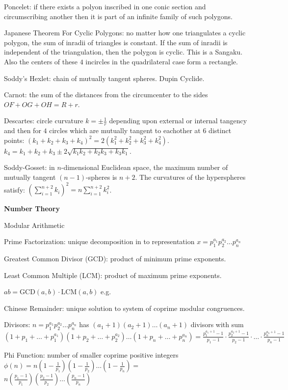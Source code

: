 Poncelet: if there exists a polyon inscribed in one conic section and circumscribing another then it is part of an infinite family of such polygons.

Japanese Theorem For Cyclic Polygons: no matter how one triangulates a cyclic polygon, the sum of inradii of triangles is constant. If the sum of inradii is independent of the triangulation, then the polygon is cyclic. This is a Sangaku. Also the centers of these $4$ incircles in the quadrilateral case form a rectangle.

Soddy's Hexlet: chain of mutually tangent spheres. Dupin Cyclide.

Carnot: the sum of the distances from the circumcenter to the sides $OF + OG + OH = R + r$.

Descartes: circle curvature $k = \pm \frac{1}{r}$ depending upon external or internal tangency and then for $4$ circles which are mutually tangent to eachother at $6$ distinct points: $\left( k_1 + k_2 + k_3 + k_4 \right)^2 = 2 \left( k_1^2 + k_2^2 + k_3^2 + k_4^2 \right)$. $k_4 = k_1 + k_2 + k_3 \pm 2 \sqrt{k_1 k_2 + k_2 k_3 + k_3 k_1}$.

Soddy-Gosset: in $n$-dimensional Euclidean space, the maximum number of mutually tangent $(n-1)$-spheres is $n+2$. The curvatures of the hyperspheres satisfy: $\left( \sum_{i=1}^{n+2} k_i \right)^2 = n \sum_{i=1}^{n+2} k_i^2$.

\newpage

\textbf{Number Theory}

Modular Arithmetic

Prime Factorization: unique decomposition in to representation $x=p_1^{a_1} p_2^{a_2}\dots p_n^{a_n}$

Greatest Common Divisor (GCD): product of minimum prime exponents.

Least Common Multiple (LCM): product of maximum prime exponents.

$ab=\text{GCD}(a,b) \cdot \text{LCM}(a,b)$ e.g.

Chinese Remainder: unique solution to system of coprime modular congruences.

Divisors: $n=p_1^{a_1} p_2^{a_2} \dots p_n^{a_n}$ has $(a_1 + 1)(a_2 + 1) \dots (a_n + 1)$ divisors with sum $(1+p_1+ \dots + p_1^{a_1})(1+p_2+ \dots + p_2^{a_2}) \dots (1+p_n+ \dots + p_n^{a_n}) = \frac{p_1^{a_1+1}-1}{p_1-1} \cdot \frac{p_2^{a_2+1}-1}{p_2-1} \cdot \dots \cdot \frac{p_n^{a_n+1}-1}{p_n-1}$

Phi Function: number of smaller coprime positive integers $\phi(n)=n\left(1-\frac{1}{p_1}\right)\left(1-\frac{1}{p_2}\right)\dots\left(1-\frac{1}{p_n}\right)=$ \\
$n\left(\frac{p_1-1}{p_1}\right)\left(\frac{p_2-1}{p_2}\right)\dots\left(\frac{p_n-1}{p_n}\right)$

